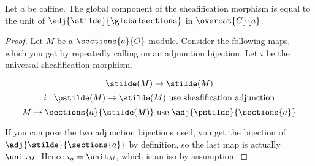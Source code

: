 \begin{lemma}
Let $a$ be caffine.
The global component of the sheafification morphism is equal to the unit of $\adj{\stilde}{\globalsections}$ in $\overcat{C}{a}$.
\end{lemma}

\begin{proof}
Let $M$ be a $\sections{a}{O}$-module.
Consider the following maps, which you get by repeatedly calling on an adjunction bijection.
Let $i$ be the universal sheafification morphism.

\[\stilde(M) \rightarrow \stilde(M)\]
\[	i : \pstilde(M) \rightarrow \stilde(M) \mbox{ use sheafification adjunction}\]
\[ M \rightarrow \sections{a}{\stilde(M)} \mbox{ use } \adj{\pstilde}{\sections{a}}\]

If you compose the two adjunction bijections used, you get the bijection of $\adj{\stilde}{\sections{a}}$
by definition, so the last map is actually $\unit_M$.
Hence $i_a = \unit_{M}$, which is an iso by assumption.
\end{proof}
